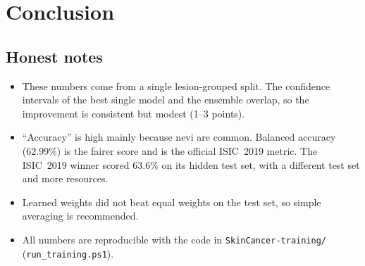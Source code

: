 \documentclass[10.5pt,a4paper]{article}
\begin{document}
\section{Conclusion}

\subsection*{Honest notes}
\begin{itemize}
  \item These numbers come from a single lesion-grouped split. The
        confidence intervals of the best single model and the ensemble
        overlap, so the improvement is consistent but modest (1--3
        points).
  \item ``Accuracy'' is high mainly because nevi are common. Balanced
        accuracy (62.99\%) is the fairer score and is the official ISIC~2019
        metric. The ISIC~2019 winner scored 63.6\% on its hidden test set,
        with a different test set and more resources.
  \item Learned weights did not beat equal weights on the test set, so
        simple averaging is recommended.
  \item All numbers are reproducible with the code in
        \texttt{SkinCancer-training/} (\texttt{run\_training.ps1}).
\end{itemize}
\end{document}
